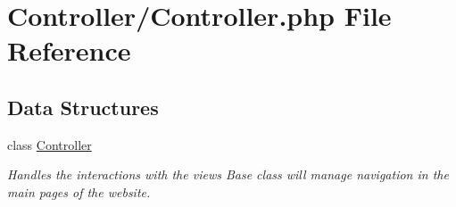 \hypertarget{_controller_8php}{}\section{Controller/\+Controller.php File Reference}
\label{_controller_8php}
\subsection*{Data Structures}
\begin{DoxyCompactItemize}
\item 
class \hyperlink{class_controller}{Controller}
\begin{DoxyCompactList}\small\item\em Handles the interactions with the views Base class will manage navigation in the main pages of the website. \end{DoxyCompactList}\end{DoxyCompactItemize}
